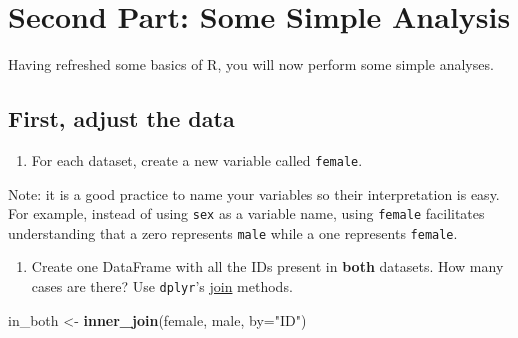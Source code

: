 \documentclass[
]{book}
\newenvironment{Shaded}{\begin{snugshade}}{\end{snugshade}}
\newcommand{\AttributeTok}[1]{\textcolor[rgb]{0.13,0.29,0.53}{#1}}
\newcommand{\DecValTok}[1]{\textcolor[rgb]{0.00,0.00,0.81}{#1}}
\newcommand{\FunctionTok}[1]{\textcolor[rgb]{0.13,0.29,0.53}{\textbf{#1}}}
\newcommand{\NormalTok}[1]{#1}
\newcommand{\OtherTok}[1]{\textcolor[rgb]{0.56,0.35,0.01}{#1}}
\newcommand{\SpecialCharTok}[1]{\textcolor[rgb]{0.81,0.36,0.00}{\textbf{#1}}}
\newcommand{\StringTok}[1]{\textcolor[rgb]{0.31,0.60,0.02}{#1}}
\providecommand{\tightlist}{%
  \setlength{\itemsep}{0pt}\setlength{\parskip}{0pt}}
\begin{document}
\hypertarget{second-part-some-simple-analysis}{%
\section{Second Part: Some Simple Analysis}\label{second-part-some-simple-analysis}}

Having refreshed some basics of R, you will now perform some simple analyses.

\hypertarget{first-adjust-the-data}{%
\subsection{First, adjust the data}\label{first-adjust-the-data}}

\begin{enumerate}
\def\labelenumi{\arabic{enumi}.}
\tightlist
\item
  For each dataset, create a new variable called \texttt{female}.
\end{enumerate}

Note: it is a good practice to name your variables so their interpretation is easy. For example, instead of using \texttt{sex} as a variable name, using \texttt{female} facilitates understanding that a zero represents \texttt{male} while a one represents \texttt{female}.

\begin{Shaded}
\end{Shaded}

\begin{enumerate}
\def\labelenumi{\arabic{enumi}.}
\setcounter{enumi}{1}
\tightlist
\item
  Create one DataFrame with all the IDs present in \textbf{both} datasets. How many cases are there? Use \texttt{dplyr}'s \href{https://www.geeksforgeeks.org/joining-data-in-r-with-dplyr-package/}{join} methods.
\end{enumerate}

\begin{Shaded}
\begin{Highlighting}[]
\NormalTok{in\_both }\OtherTok{\textless{}{-}} \FunctionTok{inner\_join}\NormalTok{(female, male, }\AttributeTok{by=}\StringTok{"ID"}\NormalTok{)}
\end{Highlighting}
\end{Shaded}
\end{document}
